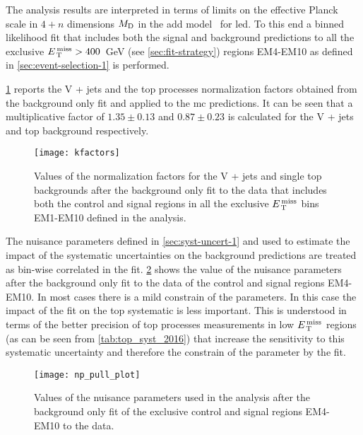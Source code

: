 The analysis results are interpreted in terms of limits on the effective Planck
scale in $4 + n$ dimensions $M_\mathrm{D}$ in the \gls{add} model~\cite{ADDPaper} for
\gls{led}. To this end a binned likelihood fit that includes both the signal and
background predictions to all the exclusive $E_\mathrm{\, T}^\mathrm{\, miss} > 400$~GeV (see
\cref{sec:fit-strategy}) regions EM4-EM10 as defined in
\cref{sec:event-selection-1} is performed.

\cref{fig:kfactors} reports the V + jets and the top processes normalization
factors obtained from the background only fit and applied to the \gls{mc}
predictions. It can be seen that a multiplicative factor of $1.35 \pm 0.13$ and
$0.87 \pm 0.23$ is calculated for the V + jets and top background respectively.
\begin{figure}[!h]
  \centering
  \texttt{[image: kfactors]}
  \caption{Values of the normalization factors for the V + jets and single top
    backgrounds after the background only fit to the data that includes both the
    control and signal regions in all the exclusive $E_\mathrm{\, T}^\mathrm{\, miss}$ bins EM1-EM10 defined
    in the analysis.}
  \label{fig:kfactors}
\end{figure}

The nuisance parameters defined in \cref{sec:syst-uncert-1} and used to estimate
the impact of the systematic uncertainties on the background predictions are
treated as bin-wise correlated in the fit. \cref{fig:np_pull} shows the value of
the nuisance parameters after the background only fit to the data of the control
and signal regions EM4-EM10. In most cases there is a mild constrain of the
parameters. In this case the impact of the fit on the top systematic is less
important. This is understood in terms of the better precision of top processes
measurements in low $E_\mathrm{\, T}^\mathrm{\, miss}$ regions (as can be seen from
\cref{tab:top_syst_2016}) that increase the sensitivity to this systematic
uncertainty and therefore the constrain of the parameter by the fit.
\begin{figure}[!h]
  \centering
  \texttt{[image: np\_pull\_plot]}
  \caption{Values of the nuisance parameters used in the analysis after the
    background only fit of the exclusive control and signal regions EM4-EM10 to
    the data.}
  \label{fig:np_pull}
\end{figure}

